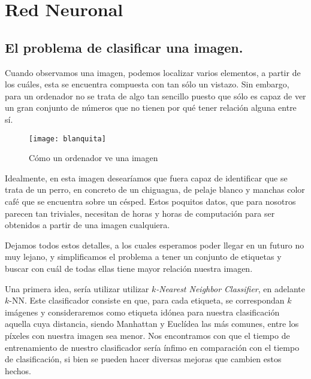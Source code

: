 
\chapter{Red Neuronal}
\section{El problema de clasificar una imagen.}

Cuando observamos una imagen, podemos localizar varios elementos, a partir de los cuáles, esta se encuentra compuesta con tan sólo un vistazo. Sin embargo, para un ordenador no se trata de algo tan sencillo puesto que sólo es capaz de ver un gran conjunto de números que no tienen por qué tener relación alguna entre sí.\newline

\begin{figure}[htpb]
  \centering
  \texttt{[image: blanquita]}
  \caption{Cómo un ordenador ve una imagen}
  \label{fig:blanquita}
\end{figure}

Idealmente, en esta imagen desearíamos que fuera capaz de identificar que se trata de un perro, en concreto de un chiguagua, de pelaje blanco y manchas color café que se encuentra sobre un césped. Estos poquitos datos, que para nosotros parecen tan triviales, necesitan de horas y horas de computación para ser obtenidos a partir de una imagen cualquiera.\newline

Dejamos todos estos detalles, a los cuales esperamos poder llegar en un futuro no muy lejano, y simplificamos el problema a tener un conjunto de etiquetas y buscar con cuál de todas ellas tiene mayor relación nuestra imagen.\newline

Una primera idea, sería utilizar utilizar \emph{$k$-Nearest Neighbor Classifier}, en adelante $k$-NN. Este clasificador consiste en que, para cada etiqueta, se correspondan $k$ imágenes y consideraremos como etiqueta idónea para nuestra clasificación aquella cuya distancia, siendo Manhattan y Euclídea las más comunes, entre los píxeles con nuestra imagen sea menor. Nos encontramos con que el tiempo de entrenamiento de nuestro clasificador sería ínfimo en comparación con el tiempo de clasificación, si bien se pueden hacer diversas mejoras que cambien estos hechos. \newline

